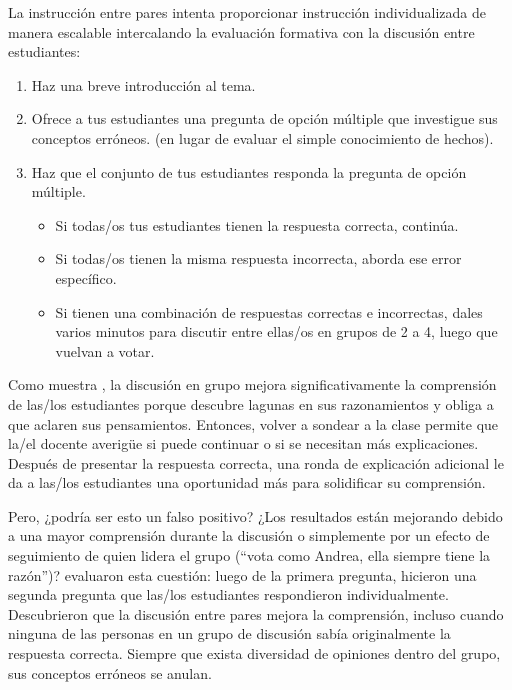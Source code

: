 La instrucción entre pares intenta proporcionar instrucción individualizada de manera escalable
intercalando la evaluación formativa con la discusión entre estudiantes:

\begin{enumerate}

\item
  Haz una breve introducción al tema.

\item
  Ofrece a tus estudiantes una pregunta de opción múltiple que investigue sus conceptos erróneos.
  (en lugar de evaluar el simple conocimiento de hechos).

\item
  Haz que el conjunto de tus estudiantes responda la pregunta de opción múltiple.

  \begin{itemize}

  \item
    Si todas/os tus estudiantes tienen la respuesta correcta, continúa.

  \item
    Si todas/os tienen la misma respuesta incorrecta,
    aborda ese error específico.

  \item
    Si tienen una combinación de respuestas correctas e incorrectas,
    dales varios minutos para discutir entre ellas/os en grupos de 2 a 4,
    luego que vuelvan a votar.

  \end{itemize}

\end{enumerate}

Como muestra
,
la discusión en grupo mejora significativamente la comprensión de las/los estudiantes
porque descubre lagunas en sus razonamientos y obliga a que aclaren sus pensamientos.
Entonces, volver a sondear a la clase permite que la/el docente averigüe si puede continuar
o si se necesitan más explicaciones.
Después de presentar la respuesta correcta,
una ronda de explicación adicional le da a las/los estudiantes una oportunidad más para solidificar su comprensión.

Pero, ¿podría ser esto un falso positivo?
¿Los resultados están mejorando debido a una mayor comprensión durante la discusión
o simplemente por un efecto de seguimiento de quien lidera el grupo (``vota como Andrea, ella siempre tiene la razón'')?
\cite{Smit2009} evaluaron esta cuestión: luego de la primera pregunta,
hicieron una segunda pregunta
que las/los estudiantes respondieron individualmente.
Descubrieron que la discusión entre pares mejora la comprensión,
incluso cuando ninguna de las personas en un grupo de discusión sabía originalmente la respuesta correcta.
Siempre que exista diversidad de opiniones dentro del grupo,
sus conceptos erróneos se anulan.

